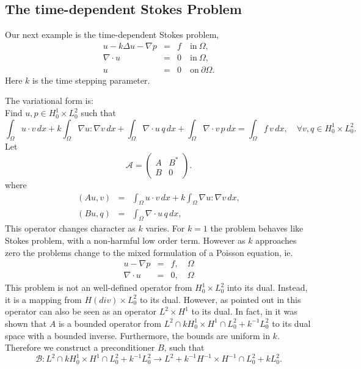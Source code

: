 \subsection{The time-dependent Stokes Problem}
Our next example is the time-dependent Stokes problem,
\begin{eqnarray}
u - k \Delta u - \nabla p &=& f \quad \mbox{in} \ \Omega, \\ 
\nabla \cdot u &=& 0 \quad \mbox{in} \  \Omega, \\
             u &=& 0   \quad \mbox{on} \  \partial \Omega.  
\end{eqnarray}
Here $k$ is the time stepping parameter. 

The variational form is: \\ 
Find $u,p \in H^1_0 \times L_0^2$ such that  
\[
\int_\Omega u \cdot v \,  dx + 
k \int_\Omega \nabla u : \nabla v \,  dx + 
\int_\Omega \nabla \cdot u \, q \,  dx +  
\int_\Omega \nabla \cdot v \, p \,  dx = \int_\Omega f\, v\, dx   , \quad \forall v,q \in H^1_0 \times L_0^2.
\]
Let 
\[
\mathcal{A}  =
\begin{pmatrix} A & B^* \\ B & 0 \end{pmatrix}.
\]
where 
\begin{eqnarray}
(A u, v) &=& \int_\Omega u \cdot v \,  dx +  k \int_\Omega \nabla u : \nabla v \,  dx, \\  
(B u, q) &=& \int_\Omega \nabla \cdot u \, q \,  dx,    
\end{eqnarray}
This operator changes character as $k$ varies.  
For $k=1$ the problem behaves like Stokes problem, with 
a non-harmful low order term. However as $k$ approaches
zero the problems change to the mixed formulation of 
a Poisson equation, ie. 
\begin{eqnarray*}
u - \nabla p &=& f, \quad \Omega \\
\nabla \cdot u  &=& 0, \quad \Omega
\end{eqnarray*}
This problem is not an well-defined operator from 
$H^1_0 \times L_0^2$ into its dual. Instead, it
is a mapping from $H(div) \times L_0^2$  to its dual. 
However, as pointed out in \cite{M-W-04} this operator
can also be seen as an operator $L^2 \times H^1$ to its dual.  
In fact, in \cite{M-T-W-02,M-W-04} it was shown that 
 $A$ is a bounded operator from
$L^2 \cap k H^1_0 \times H^1 \cap L_0^2 + k^{-1} L_0^2$ to its dual space
with a bounded inverse. Furthermore, the bounds are uniform in $k$. 
Therefore we 
construct a preconditioner $B$, such that  
\[
\mathcal{B}: L^2 \cap k H^1_0 \times H^1 \cap L_0^2 + k^{-1} L_0^2 \rightarrow 
L^2 + k^{-1} H^{-1} \times H^{-1} \cap L_0^2 + k L_0^2  .
\] 
